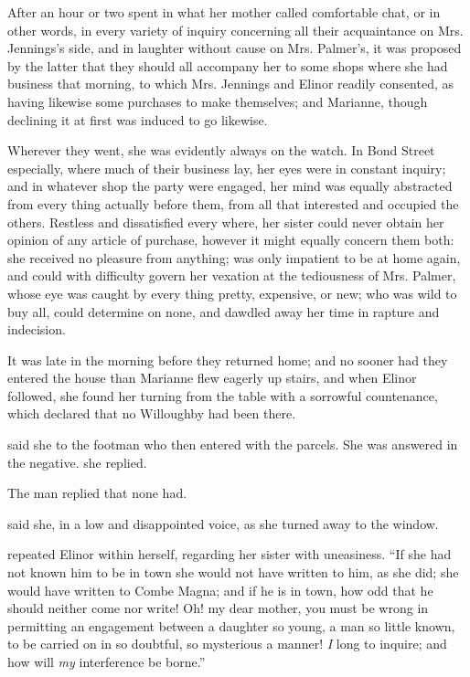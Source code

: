 After an hour or two spent in what her mother called comfortable chat, or in other words, in every variety of inquiry concerning all their acquaintance on Mrs. Jennings's side, and in laughter without cause on Mrs. Palmer's, it was proposed by the latter that they should all accompany her to some shops where she had business that morning, to which Mrs. Jennings and Elinor readily consented, as having likewise some purchases to make themselves; and Marianne, though declining it at first was induced to go likewise.

Wherever they went, she was evidently always on the watch. In Bond Street especially, where much of their business lay, her eyes were in constant inquiry; and in whatever shop the party were engaged, her mind was equally abstracted from every thing actually before them, from all that interested and occupied the others. Restless and dissatisfied every where, her sister could never obtain her opinion of any article of purchase, however it might equally concern them both: she received no pleasure from anything; was only impatient to be at home again, and could with difficulty govern her vexation at the tediousness of Mrs. Palmer, whose eye was caught by every thing pretty, expensive, or new; who was wild to buy all, could determine on none, and dawdled away her time in rapture and indecision.

It was late in the morning before they returned home; and no sooner had they entered the house than Marianne flew eagerly up stairs, and when Elinor followed, she found her turning from the table with a sorrowful countenance, which declared that no Willoughby had been there.

 said she to the footman who then entered with the parcels. She was answered in the negative.  she replied. 

The man replied that none had.

 said she, in a low and disappointed voice, as she turned away to the window.

 repeated Elinor within herself, regarding her sister with uneasiness. “If she had not known him to be in town she would not have written to him, as she did; she would have written to Combe Magna; and if he is in town, how odd that he should neither come nor write! Oh! my dear mother, you must be wrong in permitting an engagement between a daughter so young, a man so little known, to be carried on in so doubtful, so mysterious a manner! {\em I} long to inquire; and how will {\em my} interference be borne.”


